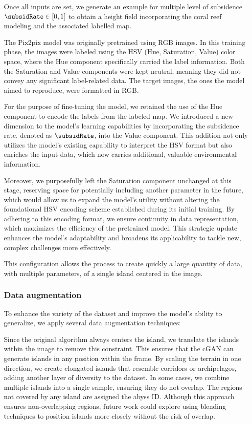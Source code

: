Once all inputs are set, we generate an example for multiple level of subsidence $\subsidRate \in [0, 1]$ to obtain a height field incorporating the coral reef modeling and the associated labelled map. 

The Pix2pix model was originally pretrained using RGB images. In this training phase, the images were labeled using the HSV (Hue, Saturation, Value) color space, where the Hue component specifically carried the label information. Both the Saturation and Value components were kept neutral, meaning they did not convey any significant label-related data. The target images, the ones the model aimed to reproduce, were formatted in RGB.

For the purpose of fine-tuning the model, we retained the use of the Hue component to encode the labels from the labeled map. We introduced a new dimension to the model's learning capabilities by incorporating the subsidence rate, denoted as $\subsidRate$, into the Value component. This addition not only utilizes the model's existing capability to interpret the HSV format but also enriches the input data, which now carries additional, valuable environmental information.

Moreover, we purposefully left the Saturation component unchanged at this stage, reserving space for potentially including another parameter in the future, which would allow us to expand the model's utility without altering the foundational HSV encoding scheme established during its initial training. By adhering to this encoding format, we ensure continuity in data representation, which maximizes the efficiency of the pretrained model. This strategic update enhances the model's adaptability and broadens its applicability to tackle new, complex challenges more effectively.

This configuration allows the process to create quickly a large quantity of data, with multiple parameters, of a single island centered in the image. 

\subsubsection{Data augmentation}

To enhance the variety of the dataset and improve the model's ability to generalize, we apply several data augmentation techniques:
\begin{Itemize}
     Since the original algorithm always centers the island, we translate the islands within the image to remove this constraint. This ensures that the cGAN can generate islands in any position within the frame.
     By scaling the terrain in one direction, we create elongated islands that resemble corridors or archipelagos, adding another layer of diversity to the dataset.
     In some cases, we combine multiple islands into a single sample, ensuring they do not overlap. The regions not covered by any island are assigned the abyss ID. Although this approach ensures non-overlapping regions, future work could explore using blending techniques to position islands more closely without the risk of overlap.
\end{Itemize}

